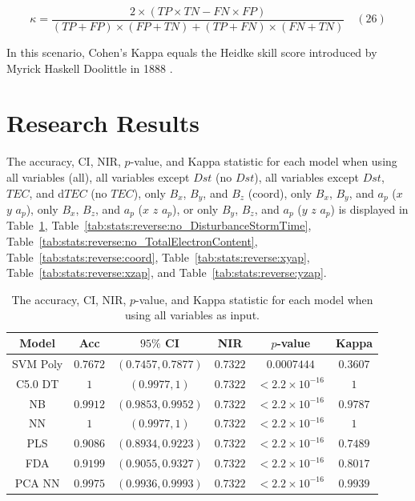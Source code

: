 \documentclass[sn-mathphys-num]{sn-jnl}%
\begin{document}
\begin{equation}
	\kappa ={\frac{2\times (TP\times TN-FN\times FP)}{(TP+FP)\times (FP+TN)+(TP+FN)\times (FN+TN)}}
	\quad\left(26\right)
\end{equation}

In this scenario, Cohen's Kappa equals the Heidke skill score introduced by Myrick Haskell Doolittle in 1888 \cite{heidke1926berechnung, philosophical1887bulletin}.

\section{Research Results}
\label{sec:Results}

The accuracy, CI, NIR, $p$-value, and Kappa statistic for each model when using all variables (all), all variables except $Dst$ (no $Dst$), all variables except $Dst$, $TEC$, and d$TEC$ (no $TEC$), only $B_{x}$, $B_{y}$, and $B_{z}$ (coord), only $B_{x}$, $B_{y}$, and $a_{p}$ ($x$ $y$ $a_{p}$), only $B_{x}$, $B_{z}$, and $a_{p}$ ($x$ $z$ $a_{p}$), or only $B_{y}$, $B_{z}$, and $a_{p}$ ($y$ $z$ $a_{p}$) is displayed in Table~\ref{tab:stats:reverse:all}, Table~\ref{tab:stats:reverse:no_DisturbanceStormTime}, Table~\ref{tab:stats:reverse:no_TotalElectronContent}, Table~\ref{tab:stats:reverse:coord}, Table~\ref{tab:stats:reverse:xyap}, Table~\ref{tab:stats:reverse:xzap}, and Table~\ref{tab:stats:reverse:yzap}.

\begin{table}[!ht]
    \centering
    \caption{The accuracy, CI, NIR, $p$-value, and Kappa statistic for each model when using all variables as input.}
	\label{tab:stats:reverse:all}
	\begin{tabular}{|c|c|c|c|c|c|}
		\hline
		Model & Acc & $95\%$ CI & NIR & $p$-value & Kappa \\ \hline
		SVM Poly & $0.7672$ & $(0.7457, 0.7877)$ & $0.7322$ & $0.0007444$ & $0.3607$ \\ \hline
		C5.0 DT & $1$ & $(0.9977, 1)$ & $0.7322$ & $< 2.2 \times {10}^{-16}$ & $1$ \\ \hline
		NB & $0.9912$ & $(0.9853, 0.9952)$ & $0.7322$ & $< 2.2 \times {10}^{-16}$ & $0.9787$ \\ \hline
		NN & $1$ & $(0.9977, 1)$ & $0.7322$ & $< 2.2 \times {10}^{-16}$ & $1$ \\ \hline
		PLS & $0.9086$ & $(0.8934, 0.9223)$ & $0.7322$ & $< 2.2 \times {10}^{-16}$ & $0.7489$ \\ \hline
		FDA & $0.9199$ & $(0.9055, 0.9327)$ & $0.7322$ & $< 2.2 \times {10}^{-16}$ & $0.8017$ \\ \hline
		PCA NN & $0.9975$ & $(0.9936, 0.9993)$ & $0.7322$ & $< 2.2 \times {10}^{-16}$ & $0.9939$ \\ \hline
	\end{tabular}
\end{table}
\end{document}
